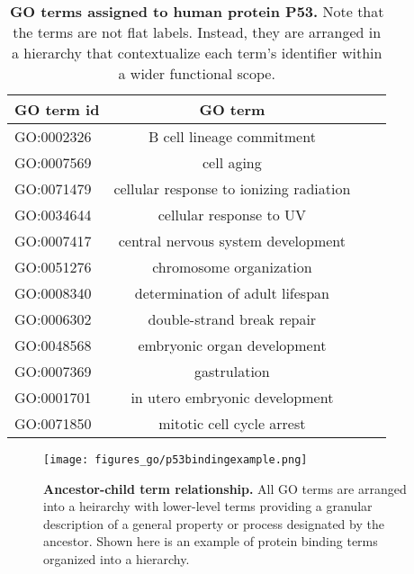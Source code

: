 \documentclass[12pt,a4paper]{report}
\begin{document}
\begin{table*}
\begin{minipage}[c][\textheight]{\textwidth}
\centering
\vspace{-6in}
\setlength{\tabcolsep}{5pt} %
\renewcommand{\arraystretch}{0.5} %
\begin{tabular}{lcll}
\textbf{GO term id} & \textbf{GO term}\\ \hline
GO:0002326 & B cell lineage commitment               \\
GO:0007569 & cell aging                              \\
GO:0071479 & cellular response to ionizing radiation \\
GO:0034644 & cellular response to UV                 \\
GO:0007417 & central nervous system development      \\
GO:0051276 & chromosome organization                 \\
GO:0008340 & determination of adult lifespan         \\
GO:0006302 & double-strand break repair              \\
GO:0048568 & embryonic organ development             \\
GO:0007369 & gastrulation                            \\
GO:0001701 & in utero embryonic development          \\
GO:0071850 & mitotic cell cycle arrest  \\ \hline
\end{tabular}
 \caption[GO terms assigned to human protein P53.]{\textbf{GO terms assigned to human protein P53.} Note that the terms are not flat labels. Instead, they are arranged in a hierarchy that contextualize each term's identifier within a wider functional scope.}
  \label{table:table_p53terms}
    \end{minipage}
\end{table*}




\begin{figure}
\begin{minipage}[c][\textheight]{\textwidth}
\centering
\vspace*{-4in}
  \texttt{[image: figures\_go/p53bindingexample.png]}
  \caption[Ancestor-child term relationship.]{\textbf{Ancestor-child term relationship.} All GO terms are arranged into a heirarchy with lower-level terms providing a granular description of a general property or process designated by the ancestor. Shown here is an example of protein binding terms organized into a hierarchy.}
  \label{fig:term_example_onto}
 \end{minipage}
\end{figure}
\end{document}
